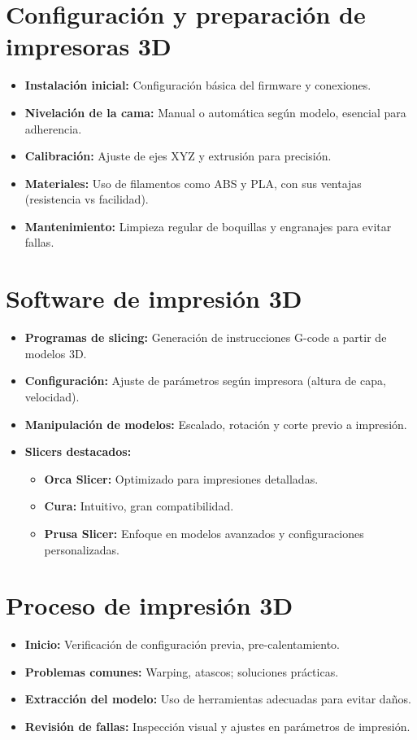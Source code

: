\documentclass[compacto,5pt,comentarios]{aleph-notas}
\begin{document}
\newpage
\section{Configuración y preparación de impresoras 3D}
\begin{itemize}
    \item \textbf{Instalación inicial:} Configuración básica del firmware y conexiones.
    \item \textbf{Nivelación de la cama:} Manual o automática según modelo, esencial para adherencia.
    \item \textbf{Calibración:} Ajuste de ejes XYZ y extrusión para precisión.
    \item \textbf{Materiales:} Uso de filamentos como ABS y PLA, con sus ventajas (resistencia vs facilidad).
    \item \textbf{Mantenimiento:} Limpieza regular de boquillas y engranajes para evitar fallas.
\end{itemize}

\section{Software de impresión 3D}
\begin{itemize}
    \item \textbf{Programas de slicing:} Generación de instrucciones G-code a partir de modelos 3D.
    \item \textbf{Configuración:} Ajuste de parámetros según impresora (altura de capa, velocidad).
    \item \textbf{Manipulación de modelos:} Escalado, rotación y corte previo a impresión.
    \item \textbf{Slicers destacados:}
    \begin{itemize}
        \item \textbf{Orca Slicer:} Optimizado para impresiones detalladas.
        \item \textbf{Cura:} Intuitivo, gran compatibilidad.
        \item \textbf{Prusa Slicer:} Enfoque en modelos avanzados y configuraciones personalizadas.
    \end{itemize}
\end{itemize}

\section{Proceso de impresión 3D}
\begin{itemize}
    \item \textbf{Inicio:} Verificación de configuración previa, pre-calentamiento.
    \item \textbf{Problemas comunes:} Warping, atascos; soluciones prácticas.
    \item \textbf{Extracción del modelo:} Uso de herramientas adecuadas para evitar daños.
    \item \textbf{Revisión de fallas:} Inspección visual y ajustes en parámetros de impresión.
\end{itemize}
\end{document}
